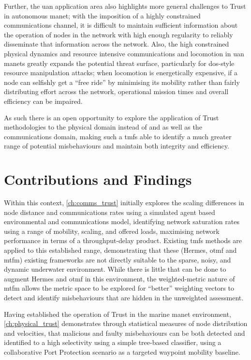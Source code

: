 Further, the \gls{uan} application area also highlights more general challenges to Trust in autonomous \gls{manet}; with the imposition of a highly constrained communications channel, it is difficult to maintain sufficient information about the operation of nodes in the network with high enough regularity to reliably disseminate that information across the network.
Also, the high constrained physical dynamics and resource intensive communications and locomotion in \gls{uan} \glspl{manet} greatly expands the potential threat surface, particularly for \gls{dos}-style resource manipulation attacks; when locomotion is energetically expensive, if a node can selfishly get a ``free ride'' by minimising its mobility rather than fairly distributing effort across the network, operational mission times and overall efficiency can be impaired. 

As such there is an open opportunity to explore the application of Trust methodologies to the physical domain instead of and as well as the communications domain, making such a \glspl{tmf} able to identify a much greater range of potential misbehaviours and maintain both integrity and efficiency.


\section{Contributions and Findings}


Within this context, \autoref{ch:comms_trust} initially explores the scaling differences in node distance and communications rates using a simulated agent based environmental and communications model, identifying network saturation rates using a range of mobility, scaling, and offered loads, maximising network performance in terms of a throughput-delay product.
Existing \glspl{tmf} methods are applied to this established range, demonstrating that these (Hermes, \gls{otmf} and \gls{mtfm}) existing frameworks are not directly suitable to the sparse, noisy, and dynamic underwater environment.
While there is little that can be done to augment Hermes and \gls{otmf} in this environment, the weighted-metric nature of \gls{mtfm} allows the metric space to be explored for ``better'' weighting vectors to detect and identify misbehaviours that are hidden in the unweighted assessment.

Having established the operation of Trust in the marine \gls{manet} environment, \autoref{ch:physical_trust} demonstrates through statistical measures of node distribution and velocities, that malicious and faulty misbehaviours can be both detected and identified to a high selectivity using a simple tree-based classifier, using a collaborative Port Protection scenario as a targeted waypoint mobility baseline.

